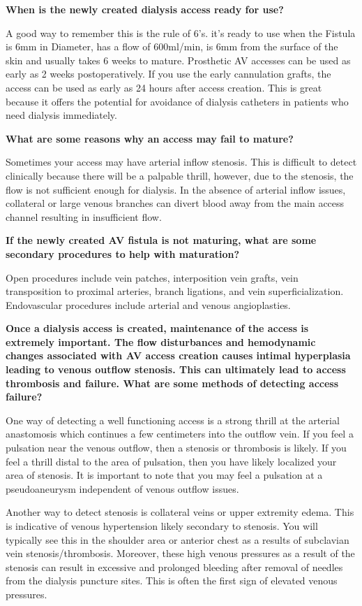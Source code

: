 \documentclass[
]{book}
\begin{document}
\textbf{When is the newly created dialysis access ready for use?}

A good way to remember this is the rule of 6's. it's ready to use when
the Fistula is 6mm in Diameter, has a flow of 600ml/min, is 6mm from the
surface of the skin and usually takes 6 weeks to mature. Prosthetic AV
accesses can be used as early as 2 weeks postoperatively. If you use the
early cannulation grafts, the access can be used as early as 24 hours
after access creation. This is great because it offers the potential for
avoidance of dialysis catheters in patients who need dialysis
immediately.

\textbf{What are some reasons why an access may fail to mature?}

Sometimes your access may have arterial inflow stenosis. This is
difficult to detect clinically because there will be a palpable thrill,
however, due to the stenosis, the flow is not sufficient enough for
dialysis. In the absence of arterial inflow issues, collateral or large
venous branches can divert blood away from the main access channel
resulting in insufficient flow.

\textbf{If the newly created AV fistula is not maturing, what are some
secondary procedures to help with maturation?}

Open procedures include vein patches, interposition vein grafts, vein
transposition to proximal arteries, branch ligations, and vein
superficialization. Endovascular procedures include arterial and venous
angioplasties.

\textbf{Once a dialysis access is created, maintenance of the access is
extremely important. The flow disturbances and hemodynamic changes
associated with AV access creation causes intimal hyperplasia leading to
venous outflow stenosis. This can ultimately lead to access thrombosis
and failure. What are some methods of detecting access failure?}

One way of detecting a well functioning access is a strong thrill at the
arterial anastomosis which continues a few centimeters into the outflow
vein. If you feel a pulsation near the venous outflow, then a stenosis
or thrombosis is likely. If you feel a thrill distal to the area of
pulsation, then you have likely localized your area of stenosis. It is
important to note that you may feel a pulsation at a pseudoaneurysm
independent of venous outflow issues.

Another way to detect stenosis is collateral veins or upper extremity
edema. This is indicative of venous hypertension likely secondary to
stenosis. You will typically see this in the shoulder area or anterior
chest as a results of subclavian vein stenosis/thrombosis. Moreover,
these high venous pressures as a result of the stenosis can result in
excessive and prolonged bleeding after removal of needles from the
dialysis puncture sites. This is often the first sign of elevated venous
pressures.
\end{document}
